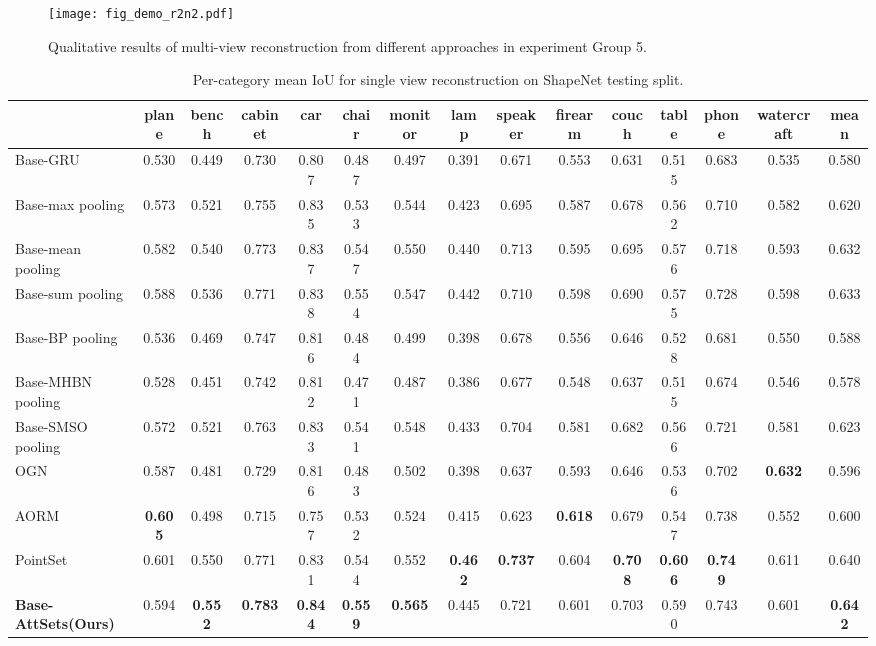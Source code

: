\documentclass[twocolumn]{svjour3}    \pdfoutput=1
\newcommand{\nickname}{AttSets}
\begin{document}
\begin{figure*}[t]
\centering
   \texttt{[image: fig\_demo\_r2n2.pdf]}
\caption{Qualitative results of multi-view reconstruction from different approaches in experiment Group 5.}
\label{fig:mv_demo_r2n2}
\vspace{-0.35cm}
\end{figure*}
\begin{table*}[t]
\caption{ Per-category mean IoU for single view reconstruction on ShapeNet testing split.}
\centering
\label{tab:iou_r2n2_1v}
\tabcolsep=0.02cm
\begin{tabular}{ l|cccccccccccccc}
\hline
&plane&bench&cabinet&car&chair&monitor&lamp&speaker&firearm&couch&table&phone&watercraft&mean \\
\hline
Base-GRU &0.530&0.449&0.730&0.807&0.487&0.497&0.391&0.671&0.553&0.631&0.515&0.683&0.535&0.580\\
Base-max pooling &0.573&0.521&0.755&0.835&0.533&0.544&0.423&0.695&0.587&0.678&0.562&0.710&0.582&0.620\\
Base-mean pooling &0.582&0.540&0.773&0.837&0.547&0.550&0.440&0.713&0.595&0.695&0.576&0.718&0.593&0.632\\
Base-sum pooling &0.588&0.536&0.771&0.838&0.554&0.547&0.442&0.710&0.598&0.690&0.575&0.728&0.598&0.633\\
Base-BP pooling &0.536&0.469&0.747&0.816&0.484&0.499&0.398&0.678&0.556&0.646&0.528&0.681&0.550&0.588\\
Base-MHBN pooling &0.528&0.451&0.742&0.812&0.471&0.487&0.386&0.677&0.548&0.637&0.515&0.674&0.546&0.578\\
Base-SMSO pooling &0.572&0.521&0.763&0.833&0.541&0.548&0.433&0.704&0.581&0.682&0.566&0.721&0.581&0.623\\
OGN &0.587&0.481&0.729&0.816&0.483&0.502&0.398&0.637&0.593&0.646&0.536&0.702&\textbf{0.632}&0.596\\
AORM &\textbf{0.605}&0.498&0.715&0.757&0.532&0.524&0.415&0.623&\textbf{0.618}&0.679&0.547&0.738&0.552&0.600\\
PointSet &0.601&0.550&0.771&0.831&0.544&0.552&\textbf{0.462}&\textbf{0.737}&0.604&\textbf{0.708}&\textbf{0.606}&\textbf{0.749}&0.611&0.640\\
\textbf{Base-\nickname{}\scriptsize{(Ours)}} &0.594&\textbf{0.552}&\textbf{0.783}&\textbf{0.844}&\textbf{0.559}&\textbf{0.565}
&0.445&0.721&0.601&0.703&0.590&0.743&0.601&\textbf{0.642}\\
\hline
\end{tabular}
\vspace{-.25 cm}
\end{table*}
\end{document}
